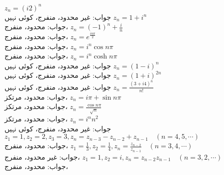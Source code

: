 \quad
$z_n=(i2)^n$\\
جواب:\quad
غیر محدود، منفرج، کوئی نہیں
\quad
$z_n=1+i^n$\\
جواب:\quad
محدود، منفرج، 
\quad
$z_n=(-1)^n+\tfrac{i}{n}$\\
جواب:\quad
محدود، منفرج، 
\quad
$z_n=e^{\tfrac{in\pi}{2}}$\\
جواب:\quad
محدود، منفرج، 
\quad
$z_n=i^n\cos n\pi$\\
جواب:\quad
محدود، منفرج، 
\quad
$z_n=i^n\cosh n\pi$\\
جواب:\quad
غیر محدود، منفرج، کوئی نہیں
\quad
$z_n=(1-i)^n$\\
جواب:\quad
غیر محدود، منفرج، کوئی نہیں
\quad
$z_n=(1+i)^{2n}$\\
جواب:\quad
غیر محدود، منفرج، کوئی نہیں
\quad
$z_n=\tfrac{(3+i4)^n}{n!}$\\
جواب:\quad
محدود، مرتکز، 
\quad
$z_n=i\pi+\sin n\pi$\\
جواب:\quad
محدود، مرتکز، 
\quad
$z_n=\tfrac{\cos n\pi}{\sqrt{n}}$\\
جواب:\quad
محدود، مرتکز، 
\quad
$z_n=i^n n^2$\\
جواب:\quad
غیر محدود، منفرج، کوئی نہیں
\quad
$z_1=1,z_2=2,z_3=3,z_n=z_{n-3}-z_{n-2}+z_{n-1}\quad (n=4,5,\cdots)$\\
جواب:\quad
محدود، منفرج، 
\quad
$z_1=\tfrac{1}{3},z_2=\tfrac{1}{4},z_n=\tfrac{z_{n-2}}{z_{n-1}}\quad (n=3,4,\cdots)$\\
جواب:\quad
غیر محدود، منفرج، 
\quad
$z_1=1,z_2=i,z_n=z_{n-2}z_{n-1}\quad (n=3,2,\cdots)$\\
جواب:\quad
محدود، منفرج، 

